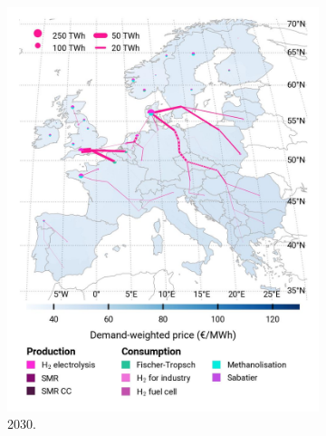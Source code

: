 \documentclass[preprint,12pt,sort&compress]{elsarticle}
\begin{document}
\begin{figure}[htbp]
  \centering
  \begin{subfigure}[t]{0.33\textwidth}
      \vspace{0pt}
      \includegraphics[width=1\textwidth]{maps/greenfield-pipelines/base_s_adm___2030-balance_map_H2}
      \caption{ 2030.}
      \label{fig:CP_lt_2030_h2}
  \end{subfigure}
  \begin{subfigure}[t]{0.33\textwidth}
      \vspace{0pt}

\end{subfigure}
\end{figure}
\end{document}
